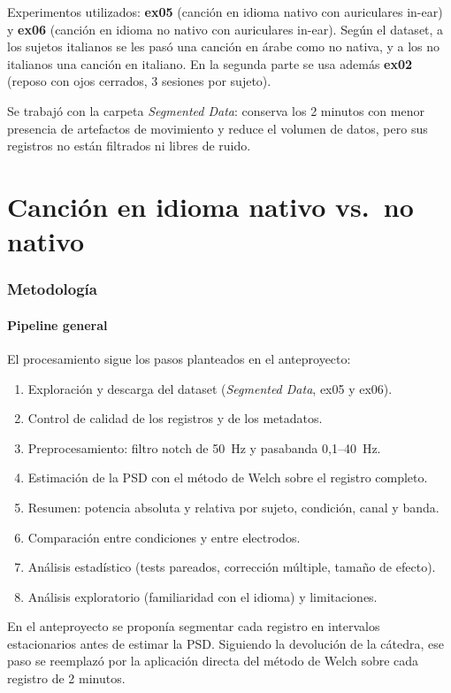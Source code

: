 \documentclass[11pt,a4paper]{article}
\begin{document}
Experimentos utilizados: \textbf{ex05} (canción en idioma nativo con auriculares in-ear) y \textbf{ex06} (canción en idioma no nativo con auriculares in-ear). Según el dataset, a los sujetos italianos se les pasó una canción en árabe como no nativa, y a los no italianos una canción en italiano. En la segunda parte se usa además \textbf{ex02} (reposo con ojos cerrados, 3 sesiones por sujeto).

Se trabajó con la carpeta \textit{Segmented Data}: conserva los 2 minutos con menor presencia de artefactos de movimiento y reduce el volumen de datos, pero sus registros no están filtrados ni libres de ruido.

\part{Canción en idioma nativo vs.\ no nativo}

\section{Metodología}

\subsection{Pipeline general}
El procesamiento sigue los pasos planteados en el anteproyecto:
\begin{enumerate}
  \item Exploración y descarga del dataset (\textit{Segmented Data}, ex05 y ex06).
  \item Control de calidad de los registros y de los metadatos.
  \item Preprocesamiento: filtro notch de 50~Hz y pasabanda 0,1--40~Hz.
  \item Estimación de la PSD con el método de Welch sobre el registro completo.
  \item Resumen: potencia absoluta y relativa por sujeto, condición, canal y banda.
  \item Comparación entre condiciones y entre electrodos.
  \item Análisis estadístico (tests pareados, corrección múltiple, tamaño de efecto).
  \item Análisis exploratorio (familiaridad con el idioma) y limitaciones.
\end{enumerate}
En el anteproyecto se proponía segmentar cada registro en intervalos estacionarios antes de estimar la PSD. Siguiendo la devolución de la cátedra, ese paso se reemplazó por la aplicación directa del método de Welch sobre cada registro de 2 minutos.
\end{document}
